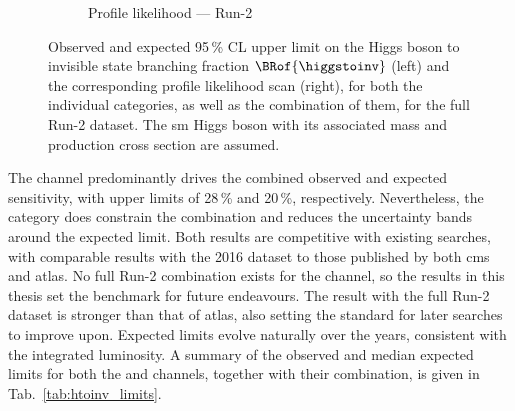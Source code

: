\begin{figure}[htbp]
\begin{subfigure}[t]{0.48\textwidth}
        \caption{Profile likelihood --- Run-2}
    \end{subfigure}
    \caption[Observed and expected 95\,\% CL upper limit on the Higgs boson to invisible state branching fraction $\BRof{\higgstoinv}$ and the corresponding profile likelihood scan, for both the individual categories, as well as the combination of them, for the full Run-2 dataset]{Observed and expected 95\,\% CL upper limit on the Higgs boson to invisible state branching fraction $\BRof{\higgstoinv}$ (left) and the corresponding profile likelihood scan (right), for both the individual categories, as well as the combination of them, for the full Run-2 dataset. The \acrlong{sm} Higgs boson with its associated mass and production cross section are assumed.}
    \label{fig:htoinv_limit_likelihood_Run2_per_cat}
\end{figure}

The \VH channel predominantly drives the combined observed and expected sensitivity, with upper limits of 28\,\% and 20\,\%, respectively. Nevertheless, the \ttH category does constrain the combination and reduces the uncertainty bands around the expected limit. Both results are competitive with existing searches, with comparable results with the 2016 dataset to those published by both \acrshort{cms} and \acrshort{atlas}. No full Run-2 combination exists for the \VH channel, so the results in this thesis set the benchmark for future endeavours. The \ttH result with the full Run-2 dataset is stronger than that of \acrshort{atlas}, also setting the standard for later searches to improve upon. Expected limits evolve naturally over the years, consistent with the integrated luminosity. A summary of the observed and median expected limits for both the \ttH and \VH channels, together with their combination, is given in Tab.~\ref{tab:htoinv_limits}.

